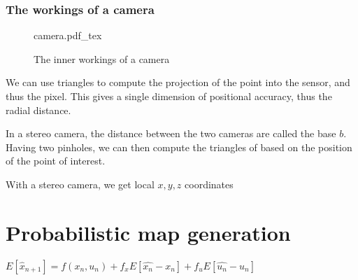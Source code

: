 \documentclass[a4paper]{article}
\newcommand{\incfig}[2][1]{%
    \def\svgwidth{#1\columnwidth}
    {#2.pdf_tex}
}
\begin{document}
\subsubsection{The workings of a camera}
\begin{figure}[ht]
    \centering
    \incfig[1]{camera}
    \caption{The inner workings of a camera}
    \label{fig:camera}
\end{figure}


We can use triangles to compute the projection of the point into the sensor, and thus the pixel.
This gives a single dimension of positional accuracy, thus the radial distance. 

In a stereo camera, the distance between the two cameras are called the base $b$.
Having two pinholes, we can then compute the triangles of based on the position of the point of interest. 


With a stereo camera, we get local $x,y,z$ coordinates



\section{Probabilistic map generation}

$E[\hat{x}_{n+1}] = f(x_n, u_n) + f_x E[\hat{x_n} - x_n] + f_u E[\hat{u_n} - u_n]$
\end{document}
